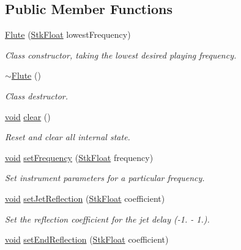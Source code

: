 \subsection*{Public Member Functions}
\begin{DoxyCompactItemize}
\item 
\hyperlink{class_nyq_1_1_flute_a0d853fd7814d7218633d3c1af999dffa}{Flute} (\hyperlink{namespace_nyq_a044fa20a706520a617bbbf458a7db7e4}{Stk\+Float} lowest\+Frequency)
\begin{DoxyCompactList}\small\item\em Class constructor, taking the lowest desired playing frequency. \end{DoxyCompactList}\item 
\hyperlink{class_nyq_1_1_flute_a8414931df85d36e3fff5bb5fce931525}{$\sim$\+Flute} ()
\begin{DoxyCompactList}\small\item\em Class destructor. \end{DoxyCompactList}\item 
\hyperlink{sound_8c_ae35f5844602719cf66324f4de2a658b3}{void} \hyperlink{class_nyq_1_1_flute_a2f1af953a074b31aeb87f1e54673590f}{clear} ()
\begin{DoxyCompactList}\small\item\em Reset and clear all internal state. \end{DoxyCompactList}\item 
\hyperlink{sound_8c_ae35f5844602719cf66324f4de2a658b3}{void} \hyperlink{class_nyq_1_1_flute_a8bbfb086cbf1f2ecad4c1506ea919579}{set\+Frequency} (\hyperlink{namespace_nyq_a044fa20a706520a617bbbf458a7db7e4}{Stk\+Float} frequency)
\begin{DoxyCompactList}\small\item\em Set instrument parameters for a particular frequency. \end{DoxyCompactList}\item 
\hyperlink{sound_8c_ae35f5844602719cf66324f4de2a658b3}{void} \hyperlink{class_nyq_1_1_flute_a5e3c90e6881515492420bcabdfd4c81e}{set\+Jet\+Reflection} (\hyperlink{namespace_nyq_a044fa20a706520a617bbbf458a7db7e4}{Stk\+Float} coefficient)
\begin{DoxyCompactList}\small\item\em Set the reflection coefficient for the jet delay (-\/1. -\/ 1.). \end{DoxyCompactList}\item 
\hyperlink{sound_8c_ae35f5844602719cf66324f4de2a658b3}{void} \hyperlink{class_nyq_1_1_flute_ad588d812bb15c2329d5bec89135f15dd}{set\+End\+Reflection} (\hyperlink{namespace_nyq_a044fa20a706520a617bbbf458a7db7e4}{Stk\+Float} coefficient)

\end{DoxyCompactItemize}
